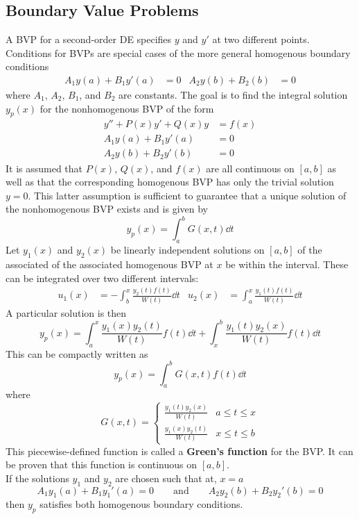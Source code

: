 \documentclass[./Differential Equations]{subfiles}
\begin{document}
		\subsection{Boundary Value Problems}
			A BVP for a second-order DE specifies \(y\) and \(y'\) at two different points. Conditions for BVPs are special cases of the more general homogenous boundary conditions
				\begin{align*}
					A_1y(a) + B_1y'(a) &= 0 &
						A_2y(b) + B_2(b) &= 0
				\end{align*}
				where \(A_1\), \(A_2\), \(B_1\), and \(B_2\) are constants. The goal is to find the integral solution \(y_p(x)\) for the nonhomogenous BVP of the form
				\begin{align*}
					y'' + P(x)y' + Q(x)y &= f(x) \\
					A_1y(a) + B_1y'(a) &= 0 \\
					A_2y(b) + B_2y'(b) &= 0
				\end{align*}
				It is assumed that \(P(x)\), \(Q(x)\), and \(f(x)\) are all continuous on \([a, b]\) as well as that the corresponding homogenous BVP has only the trivial solution \(y = 0\). This latter assumption is sufficient to guarantee that a unique solution of the nonhomogenous BVP exists and is given by
				\[y_p(x) = \int_a^b G(x, t) \dd{t}\]
				Let \(y_1(x)\) and \(y_2(x)\) be linearly independent solutions on \([a, b]\) of the associated of the associated homogenous BVP at \(x\) be within the interval. These can be integrated over two different intervals:
					\begin{align*}
						u_1(x) &= -\int_b^x \frac{y_2(t)f(t)}{W(t)} \dd{t} &
							u_2(x) &= \int_a^x \frac{y_1(t)f(t)}{W(t)} \dd{t}
					\end{align*}
					A particular solution is then
					\[y_p(x) = \int_a^x \frac{y_1(x)y_2(t)}{W(t)}f(t) \dd{t} + \int_x^b \frac{y_1(t)y_2(x)}{W(t)}f(t) \dd{t}\]
					This can be compactly written as
					\[y_p(x) = \int_a^b G(x, t) f(t) \dd{t}\]
					where
					\[
						G(x, t) = \begin{cases}
 							\frac{y_1(t)y_2(x)}{W(t)} & a \le t \le x \\
 							\frac{y_1(x)y_2(t)}{W(t)} & x \le t \le b
 						\end{cases}
 					\]
 					This piecewise-defined function is called a \textbf{Green's function} for the BVP. It can be proven that this function is continuous on \([a, b]\). \\
 					If the solutions \(y_1\) and \(y_2\) are chosen such that at, \(x = a\)
 					\[
 						A_1y_1(a) + B_1y_1'(a) = 0\qquad \text{and} \qquad
 						A_2y_2(b) + B_2y_2'(b) = 0
 					\]
 					then \(y_p\) satisfies both homogenous boundary conditions.
\end{document}
